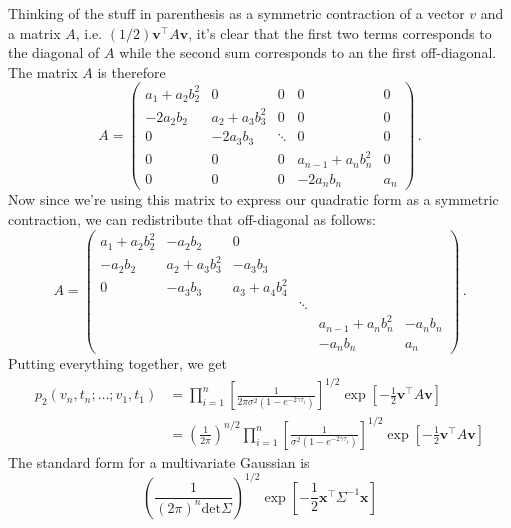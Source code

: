 Thinking of the stuff in parenthesis as a symmetric contraction of a vector $v$ and a matrix $A$, i.e. $(1/2) \mathbf{v}^\intercal A \mathbf{v}$, it's clear that the first two terms corresponds to the diagonal of $A$ while the second sum corresponds to an the first off-diagonal.
The matrix $A$ is therefore
\begin{equation*}
  A = \begin{pmatrix}
    a_1 + a_2 b_2^2 & 0 & 0 & 0 & 0 \\
    -2 a_2 b_2 & a_2 + a_3 b_3^2 & 0 & 0 & 0 \\
    0 & -2 a_3 b_3 & \ddots & 0 & 0 \\
    0 & 0 & 0 & a_{n-1} + a_n b_n^2 & 0 \\
    0 & 0 & 0 & -2 a_n b_n & a_n
  \end{pmatrix}
  \, .
\end{equation*}
Now since we're using this matrix to express our quadratic form as a symmetric contraction, we can redistribute that off-diagonal as follows:
\begin{equation*}
  A = \begin{pmatrix}
    a_1 + a_2 b_2^2 & -a_2 b_2 & 0 & & & \\
    -a_2 b_2 & a_2 + a_3 b_3^2 & -a_3 b_3 & & & \\
    0 & -a_3 b_3 & a_3 + a_4 b_4^2 & & & \\
    & & & \ddots & & \\
    & & & & a_{n-1} + a_n b_n^2 & -a_n b_n \\
    & & & & -a_n b_n & a_n
  \end{pmatrix}
  \, .
\end{equation*}
Putting everything together, we get
\begin{align*}
  p_2(v_n, t_n ; \ldots ; v_1, t_1)
  &=
  \prod_{i=1}^n
    \left[ \frac{1}{2 \pi \sigma^2 (1 - e^{-2\gamma \tau_i})} \right]^{1/2}
  \exp \left[ - \frac{1}{2} \mathbf{v}^\intercal A \mathbf{v} \right] \\
  &=
  \left( \frac{1}{2\pi} \right)^{n/2}
  \prod_{i=1}^n
    \left[ \frac{1}{\sigma^2 (1 - e^{-2\gamma \tau_i})} \right]^{1/2}
  \exp \left[ - \frac{1}{2} \mathbf{v}^\intercal A \mathbf{v} \right]
\end{align*}
The standard form for a multivariate Gaussian is
\begin{equation*}
  \left( \frac{1}{(2\pi)^n \text{det}\Sigma} \right)^{1/2} \exp \left[ - \frac{1}{2} \mathbf{x}^\intercal \Sigma^{-1} \mathbf{x} \right]
\end{equation*}
